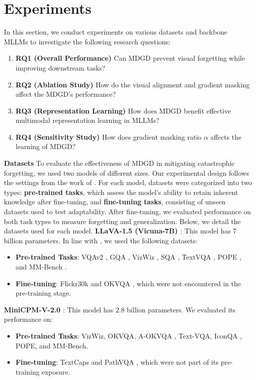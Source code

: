 

\section{Experiments}
In this section, we conduct experiments on various datasets and backbone MLLMs to investigate the following research questions:
\begin{enumerate}
    \item \textbf{RQ1 (Overall Performance)} Can MDGD prevent visual forgetting while improving downstream tasks?
    \item \textbf{RQ2 (Ablation Study)} How do the visual alignment and gradient masking affect the MDGD's performance?
    \item \textbf{RQ3 (Representation Learning)} How does MDGD benefit effective multimodal representation learning in MLLMs?
    \item \textbf{RQ4 (Sensitivity Study)} How does gradient masking ratio $\alpha$ affects the learning of MDGD?
\end{enumerate}


\noindent\textbf{Datasets}
To evaluate the effectiveness of MDGD in mitigating catastrophic forgetting, we used two models of different sizes. 
Our experimental design follows the settings from the work of \citet{zhu2024model}. 
For each model, datasets were categorized into two types: 
\textbf{pre-trained tasks}, which assess the model's ability to retain inherent knowledge after fine-tuning, 
and \textbf{fine-tuning tasks}, consisting of unseen datasets used to test adaptability. 
After fine-tuning, we evaluated performance on both task types to measure forgetting and generalization. 
Below, we detail the datasets used for each model. 
\textbf{LLaVA-1.5 (Vicuna-7B) \citep{liu2024improved}}: This model has 7 billion parameters. In line with \citet{liu2024improved}, we used the following datasets:
\begin{itemize}
    \item \textbf{Pre-trained Tasks}: VQAv2 \citep{goyal2017making}, GQA \citep{hudson2019gqa}, VizWiz \citep{gurari2018vizwiz}, SQA \citep{lu2022learn}, TextVQA \citep{singh2019towards}, POPE \citep{li2023evaluating}, and MM-Bench \citep{liu2023mmbench}.
        
    \item \textbf{Fine-tuning}: Flickr30k \citep{young2014image} and OKVQA \citep{marino2019ok}, which were not encountered in the pre-training stage.
\end{itemize}
\textbf{MiniCPM-V-2.0 \citep{yao2024minicpmvgpt4vlevelmllm}}: This model has 2.8 billion parameters. We evaluated its performance on:
\begin{itemize}
    \item \textbf{Pre-trained Tasks}: VizWiz, OKVQA, A-OKVQA \cite{schwenk2022okvqa}, Text-VQA, IconQA \cite{lu2021iconqa}, POPE, and MM-Bench.
    \item \textbf{Fine-tuning}: TextCaps \citep{sidorov2020textcaps} and PathVQA \citep{he2020pathvqa}, which were not part of its pre-training exposure.
\end{itemize}



